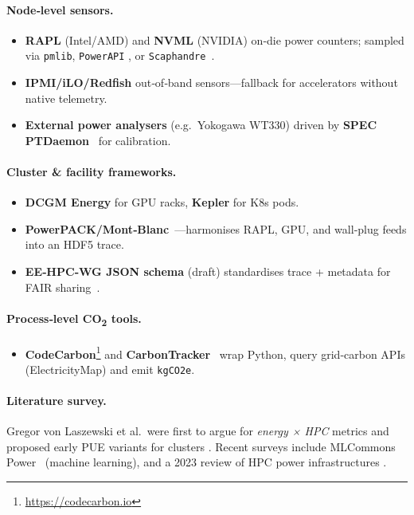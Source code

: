 
\paragraph*{Node‑level sensors.}
\begin{itemize}
  \item \textbf{RAPL} (Intel/AMD) and \textbf{NVML} (NVIDIA) on‑die power
        counters; sampled via \texttt{pmlib}, \texttt{PowerAPI}
        \cite{ibmpowerapipmli}, or \texttt{Scaphandre}~\cite{scaphandre}.
  \item \textbf{IPMI/iLO/Redfish} out‑of‑band sensors—fallback for
        accelerators without native telemetry.
  \item \textbf{External power analysers} (e.g.\ Yokogawa WT330) driven
        by \textbf{SPEC PTDaemon}~\cite{specptdaemonser} for calibration.
\end{itemize}

\paragraph*{Cluster \& facility frameworks.}
\begin{itemize}
  \item \textbf{DCGM Energy} for GPU racks, \textbf{Kepler} for K8s pods.
  \item \textbf{PowerPACK/Mont‑Blanc}~\cite{powerpackmontbl}—harmonises
        RAPL, GPU, and wall‑plug feeds into an HDF5 trace.
  \item \textbf{EE‑HPC‑WG JSON schema} (draft) standardises trace +
        metadata for FAIR sharing~\cite{eehpcwgenergybe}.
\end{itemize}

\paragraph*{Process‑level CO\textsubscript{2} tools.}
\begin{itemize}
  \item \textbf{CodeCarbon}\footnote{\url{https://codecarbon.io}}
        and \textbf{CarbonTracker}~\cite{carbontracker} wrap Python,
        query grid‑carbon APIs (ElectricityMap) and emit
        \texttt{kgCO2e}.
\end{itemize}

\paragraph*{Literature survey.}
Gregor von Laszewski et al.\ were first to argue for \emph{energy × HPC}
metrics and proposed early PUE variants for clusters
\cite{laszewski2010}.  Recent surveys include
MLCommons Power~\cite{mlperfpower} (machine learning),
and a 2023 review of HPC power infrastructures \cite{openifsenergy2023}.

